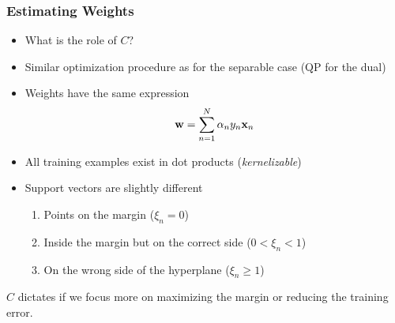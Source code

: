 \documentclass[10pt]{beamer}
\begin{document}
\begin{frame}
    {
      \frametitle{Estimating Weights}
    }
    \begin{itemize}
    \item What is the role of $C$?
    \item Similar optimization procedure as for the separable case (QP for the dual)
    \item Weights have the same expression
      \[
        {\bf w} = \sum_{n=1}^N\alpha_ny_n{\bf x}_n
        \]
      \item All training examples exist in dot products ({\em kernelizable})
      \item Support vectors are slightly different
        \begin{enumerate}
        \item Points on the margin ($\xi_n = 0$)
        \item Inside the margin but on the correct side ($0 < \xi_n < 1$)
        \item On the wrong side of the hyperplane ($\xi_n \ge 1$)
        \end{enumerate}
    \end{itemize}
        {
          $C$ dictates if we focus more on maximizing the margin or reducing the training error.
        }
\end{frame}
\end{document}
